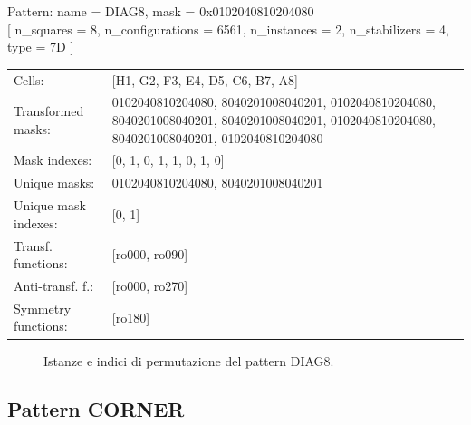 \begin{tcolorbox}[sharp corners, fontupper=\ttfamily\small, colback=white]
  \noindent Pattern: name = DIAG8, mask = 0x0102040810204080\\
  {[} n\_squares = 8, n\_configurations = 6561,
  n\_instances = 2, n\_stabilizers = 4, type = 7D { ]}\\[1.0ex]
  \begin{tabularx}{\textwidth}{@{} p{3.5cm} X @{}}
    Cells:               & {[}H1, G2, F3, E4, D5, C6, B7, A8{]}\\[0.5ex]
    Transformed masks:   & 0102040810204080, 8040201008040201, 0102040810204080, 8040201008040201, 8040201008040201, 0102040810204080, 8040201008040201, 0102040810204080\\[0.5ex]
    Mask indexes:        & {[}0, 1, 0, 1, 1, 0, 1, 0{]}\\[0.5ex]
    Unique masks:        & 0102040810204080, 8040201008040201\\[0.5ex]
    Unique mask indexes: & {[}0, 1{]}\\[0.5ex]
    Transf. functions:   & {[}ro000, ro090{]}\\[0.5ex]
    Anti-transf. f.:     & {[}ro000, ro270{]}\\[0.5ex]
    Symmetry functions:  & {[}ro180{]}\\[0.5ex]
  \end{tabularx}
\end{tcolorbox}

\begin{figure}[htbp]
  \centering
   \hfill
   \hfill
   \hfill
  \vspace{0.3cm}
   \hfill
   \hfill
   \hfill
  \caption{Istanze e indici di permutazione del pattern DIAG8.}
\end{figure}

\newpage

\subsection{Pattern CORNER}

